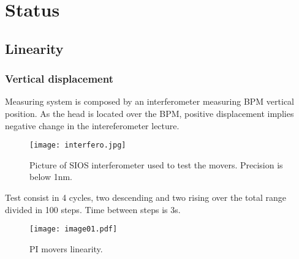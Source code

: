 \chapter{Status}
\section{Linearity}
\subsection{Vertical displacement}
Measuring system is composed by an interferometer measuring BPM vertical position. As the head is located over the BPM, positive displacement implies negative change in the intereferometer lecture.\par
\begin{figure}[htb]
\begin{center}
\texttt{[image: interfero.jpg]}\caption{Picture of SIOS interferometer used to test the movers. Precision is below 1nm.}\label{f-interfero}
\end{center}
\end{figure}\par
Test consist in 4 cycles, two descending and two rising over the total range divided in 100 steps. Time between steps is 3s.\par
\begin{figure}[htb]
\begin{center}
\texttt{[image: image01.pdf]}\caption{PI movers linearity.}\label{f-LinPI01}
\end{center}
\end{figure}
